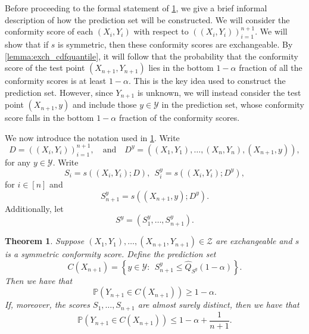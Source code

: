 \documentclass[11pt, titlepage]{article} %
\newcommand{\Prob}[1]{\mathbb{P}\left( #1 \right)}
\numberwithin{equation}{section}
\newtheorem{theorem}{Theorem}
\theoremstyle{definition}
\numberwithin{theorem}{section}
\numberwithin{lemma}{section}
\numberwithin{corollary}{section}
\numberwithin{proposition}{section}
\numberwithin{definition}{section}
\numberwithin{remark}{section}
\begin{document}
\noindent
Before proceeding to the formal statement of \cref{thm:fullconformal_coverage}, we give a brief informal description of how the prediction set will be constructed. We will consider the conformity score of each \((X_i, Y_i)\) with respect to \(((X_i, Y_i))_{i=1}^{n+1}\). We will show that if \(s\) is symmetric, then these conformity scores are exchangeable. By \cref{lemma:exch_cdfquantile}, it will follow that the probability that the conformity score of the test point \((X_{n+1}, Y_{n+1})\) lies in the bottom \(1-\alpha\) fraction of all the conformity scores is at least \(1-\alpha\). This is the key idea used to construct the prediction set. However, since \(Y_{n+1}\) is unknown, we will instead consider the test point \((X_{n+1}, y)\) and include those \(y \in \mathcal{Y}\) in the prediction set, whose conformity score falls in the bottom \(1-\alpha\) fraction of the conformity scores. \vskip5pt

\noindent
We now introduce the notation used in \cref{thm:fullconformal_coverage}. Write \[D = ((X_i, Y_i))_{i=1}^{n+1}, \quad \text{and} \quad D^{y} = ((X_1, Y_1), \ldots, (X_n, Y_n), (X_{n+1}, y)), \] for any \(y \in \mathcal{Y}\).  Write \[S_i = s((X_i, Y_i); D), \ \ S_i^y = s((X_i, Y_i); D^y), \] for \(i \in [n]\) and \[S_{n+1}^y = s((X_{n+1}, y); D^y).\] Additionally, let \[S^y = (S_1^y, \ldots, S_{n+1}^y).\]

\begin{theorem}
    Suppose \((X_1, Y_1), \ldots, (X_{n+1}, Y_{n+1}) \in \mathcal{Z}\) are exchangeable and \(s\) is a symmetric conformity score. Define the prediction set \begin{equation}
        C(X_{n+1}) = \left\{ y \in \mathcal{Y}: \ \ S_{n+1}^y \leq \hat{Q}_{S^y}(1-\alpha) \right\}.
    \label{eqn:fullconformal_prediction_set}
    \end{equation} Then we have that \[\Prob{Y_{n+1} \in C(X_{n+1})} \geq 1-\alpha.\] If, moreover, the scores \(S_1, \ldots, S_{n+1}\) are almost surely distinct, then we have that \[\Prob{Y_{n+1} \in C(X_{n+1})} \leq 1-\alpha + \frac{1}{n+1}.\]

\label{thm:fullconformal_coverage}  
\end{theorem}
\end{document}

